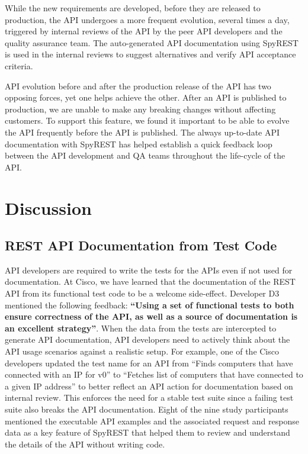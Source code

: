 \documentclass[10pt, conference]{IEEEtran}
\begin{document}
While the new requirements are developed, before they are released to production, the API undergoes a more frequent evolution, several times a day, triggered by internal reviews of the API by the peer API developers and the quality assurance team. The auto-generated API documentation using SpyREST is used in the internal reviews to suggest alternatives and verify API acceptance criteria.

API evolution before and after the production release of the API has two opposing forces, yet one helps achieve the other. After an API is published to production, we are unable to make any breaking changes without affecting customers. To support this feature, we found it important to be able to evolve the API frequently before the API is published. The always up-to-date API documentation with SpyREST has helped establish a quick feedback loop between the API development and QA teams throughout the life-cycle of the API.


\section{Discussion}

\subsection{REST API Documentation from Test Code}
API developers are required to write the tests for the APIs even if not used for documentation. At Cisco, we have learned that the documentation of the REST API from its functional test code to be a welcome side-effect. Developer D3 mentioned the following feedback: \textbf{``Using a set of functional tests to both ensure correctness of the API, as well as a source of documentation is an excellent strategy''}. When the data from the tests are intercepted to generate API documentation, API developers need to actively think about the API usage scenarios against a realistic setup. For example, one of the Cisco developers updated the test name for an API from ``Finds computers that have connected with an IP for v0'' to ``Fetches list of computers that have connected to a given IP address'' to better reflect an API action for documentation based on internal review. This enforces the need for a stable test suite since a failing test suite also breaks the API documentation. Eight of the nine study participants mentioned the executable API examples and the associated request and response data as a key feature of SpyREST that helped them to review and understand the details of the API without writing code.
\end{document}

